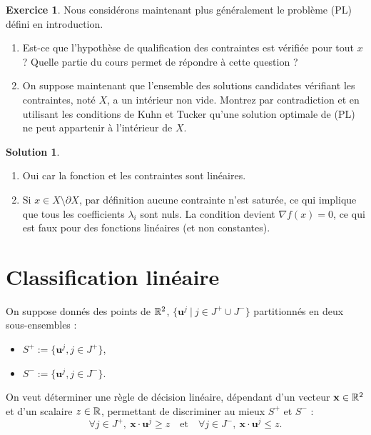 \documentclass[a4paper,francais]{article}
\newcommand{\R}{{\ensuremath\mathbb{R}}}
\theoremstyle{definition}
\newtheorem{exercice}{Exercice}[section]
\newtheorem*{solution}{Solution}
\begin{document}
\begin{exercice}
  Nous considérons maintenant plus généralement le problème (PL) défini
  en introduction. 
  \begin{enumerate}
  \item Est-ce que l'hypothèse de qualification des contraintes est vérifiée
    pour tout $x$ ? Quelle partie du cours permet de répondre à cette question ?
  \item On suppose maintenant que l'ensemble des solutions candidates vérifiant
    les contraintes, noté $X$, a un intérieur non vide. Montrez par contradiction et en utilisant les conditions de Kuhn et Tucker qu'une solution optimale de (PL) ne peut appartenir à l'intérieur de $X$.
  \end{enumerate}
\end{exercice}

\begin{solution}
  \begin{enumerate}
  \item Oui car la fonction et les contraintes sont linéaires.
  \item Si $x \in X \setminus \partial X$, par définition aucune contrainte n'est saturée,
  ce qui implique que tous les coefficients $\lambda_i$ sont nuls. La condition
  devient ${\nabla f}(x) = 0$, ce qui est faux pour des fonctions linéaires (et non
  constantes).
  \end{enumerate}
\end{solution}

\section{Classification linéaire}
\label{sec:classif}

\let\vec\mathbf

On suppose donnés des points de $\R^2$, $\{\vec{u}^j \ | \ {j \in J^+ \cup J^-} \}$
partitionnés en deux sous-ensembles :
\begin{itemize}
\item $S^+ := \{ \vec{u}^j, j \in J^+ \}$,
\item $S^- := \{ \vec{u}^j, j \in J^- \}$.
\end{itemize}
On veut déterminer une règle de décision linéaire, dépendant d'un vecteur $\vec{x} \in \R^2$
et d'un scalaire $z \in \R$, permettant de discriminer au mieux $S^+$ et $S^-$ :
\begin{equation}
  \label{eq:regle}
\forall j \in J^+, \ \vec{x} \cdot \vec{u}^j \geq z
\quad \text{et} \quad
\forall j \in J^-, \ \vec{x} \cdot \vec{u}^j \leq z.
\end{equation}
\end{document}

